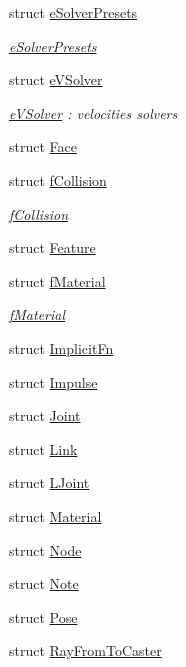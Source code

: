 \begin{DoxyCompactItemize}
struct \hyperlink{structbt_soft_body_1_1e_solver_presets}{e\+Solver\+Presets}
\begin{DoxyCompactList}\small\item\em \hyperlink{structbt_soft_body_1_1e_solver_presets}{e\+Solver\+Presets} \end{DoxyCompactList}\item 
struct \hyperlink{structbt_soft_body_1_1e_v_solver}{e\+V\+Solver}
\begin{DoxyCompactList}\small\item\em \hyperlink{structbt_soft_body_1_1e_v_solver}{e\+V\+Solver} \+: velocities solvers \end{DoxyCompactList}\item 
struct \hyperlink{structbt_soft_body_1_1_face}{Face}
\item 
struct \hyperlink{structbt_soft_body_1_1f_collision}{f\+Collision}
\begin{DoxyCompactList}\small\item\em \hyperlink{structbt_soft_body_1_1f_collision}{f\+Collision} \end{DoxyCompactList}\item 
struct \hyperlink{structbt_soft_body_1_1_feature}{Feature}
\item 
struct \hyperlink{structbt_soft_body_1_1f_material}{f\+Material}
\begin{DoxyCompactList}\small\item\em \hyperlink{structbt_soft_body_1_1f_material}{f\+Material} \end{DoxyCompactList}\item 
struct \hyperlink{structbt_soft_body_1_1_implicit_fn}{Implicit\+Fn}
\item 
struct \hyperlink{structbt_soft_body_1_1_impulse}{Impulse}
\item 
struct \hyperlink{structbt_soft_body_1_1_joint}{Joint}
\item 
struct \hyperlink{structbt_soft_body_1_1_link}{Link}
\item 
struct \hyperlink{structbt_soft_body_1_1_l_joint}{L\+Joint}
\item 
struct \hyperlink{structbt_soft_body_1_1_material}{Material}
\item 
struct \hyperlink{structbt_soft_body_1_1_node}{Node}
\item 
struct \hyperlink{structbt_soft_body_1_1_note}{Note}
\item 
struct \hyperlink{structbt_soft_body_1_1_pose}{Pose}
\item 
struct \hyperlink{structbt_soft_body_1_1_ray_from_to_caster}{Ray\+From\+To\+Caster}

\end{DoxyCompactItemize}
